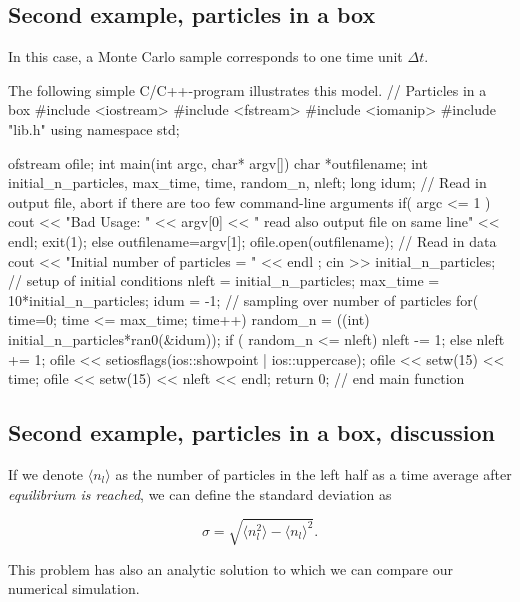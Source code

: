 \documentclass[%
oneside,                 %
final,                   %
10pt]{article}
\newenvironment{block_mdfboxadmon}[1][]{
\begin{block_mdfboxmdframed}[frametitle=#1]
}
{
\end{block_mdfboxmdframed}
}
\begin{document}
\subsection{Second example, particles in a box}

\begin{block_mdfboxadmon}[]
In this case, a Monte Carlo sample corresponds to one time unit
$\Delta t$. 

The following simple C/C++-program illustrates this model.
\bcppcod
// Particles in a box
#include <iostream>
#include <fstream>
#include <iomanip>
#include "lib.h"
using namespace  std;

ofstream ofile;
int main(int argc, char* argv[])
{
  char *outfilename;
  int initial_n_particles, max_time, time, random_n, nleft; 
  long idum;
  // Read in output file, abort if there are too few command-line arguments
  if( argc <= 1 ){
    cout << "Bad Usage: " << argv[0] <<
      " read also output file on same line" << endl;
    exit(1);
  }
  else{
    outfilename=argv[1];
  }
  ofile.open(outfilename);
  // Read in data 
  cout << "Initial number of particles = " << endl ;
  cin >> initial_n_particles;
  // setup of initial conditions
  nleft = initial_n_particles;
  max_time = 10*initial_n_particles;
  idum = -1;
  // sampling over number of particles
  for( time=0; time <= max_time; time++){
    random_n = ((int) initial_n_particles*ran0(&idum));
    if ( random_n <= nleft){
      nleft -= 1;
    }
    else{
      nleft += 1;
    }
    ofile << setiosflags(ios::showpoint | ios::uppercase);
    ofile << setw(15) << time;
    ofile << setw(15) << nleft << endl;
  }
  return 0; 
} // end main function
\ecppcod
\end{block_mdfboxadmon} %




\subsection{Second example, particles in a box, discussion}

\begin{block_mdfboxadmon}[]
If we denote $\langle n_l \rangle $ as the number of particles in the left 
half as a time average after \emph{equilibrium is reached}, 
we can define the standard 
deviation as

\begin{equation}
   \sigma =\sqrt{\langle n_l^2 \rangle-\langle n_l \rangle^2}.
\end{equation}

This problem has also an analytic solution to which we can compare
our numerical simulation.
\end{block_mdfboxadmon} %
\end{document}
